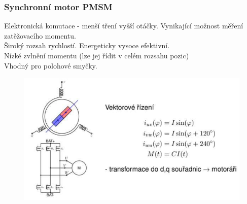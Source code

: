 \subsubsection{Synchronní motor PMSM}
Elektronická komutace - menší tření vyšší otáčky. Vynikající možnost měření zatěžovacího momentu.\\
Široký rozsah rychlostí. Energeticky vysoce efektivní.\\
Nízké zvlnění momentu (lze jej řídit v celém rozsahu pozic)\\
Vhodný pro polohové smyčky.\\
\begin{figure}[h!]
    \centering
    \includegraphics[scale = 0.4]{img/PMSM.png}
\end{figure}
\newpage
